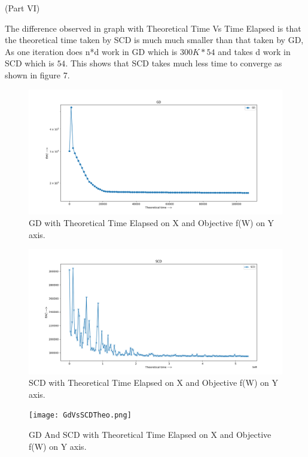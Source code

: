 \documentclass[a4paper,11pt]{article}
\begin{document}
\begin{mlsolution}
\newpage
(Part VI)

The difference observed in graph with Theoretical Time Vs Time Elapsed is that the theoretical time taken by SCD is much much smaller than that taken by GD, As one iteration does n*d work in GD which is $300K * 54$ and takes d work in SCD which is $54$. This shows that SCD takes much less time to converge as shown in figure 7.

\begin{figure}[th]%
\centering
\includegraphics[width=1.2\columnwidth]{GD-theo.png}%

\caption{GD with Theoretical Time Elapsed on X and Objective f(W) on Y axis.}%
\label{fig:GD2}%
\end{figure}

\begin{figure}[th]%
\centering
\includegraphics[width=1.2\columnwidth]{SCD-theo.png}%

\caption{SCD with Theoretical Time Elapsed on X and Objective f(W) on Y axis.}%
\label{fig:SCD2}%
\end{figure}

\begin{figure}[th]%
\centering
\texttt{[image: GdVsSCDTheo.png]}%

\caption{GD And SCD with Theoretical Time Elapsed on X and Objective f(W) on Y axis.}%
\label{fig:GD4}%
\end{figure}

\end{mlsolution}
					
\end{document}
